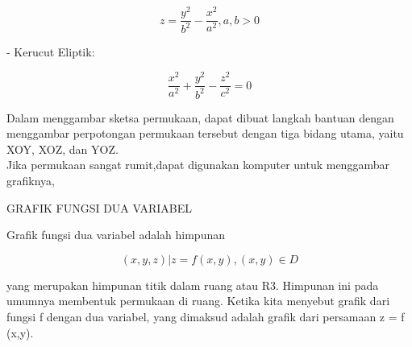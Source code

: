\documentclass[a4paper,10pt]{article}
\begin{document}
\begin{eulernotebook}
\begin{eulercomment}
\begin{eulercomment}
\begin{eulerformula}
\[
z=\frac{y^2}{b^2}-\frac{x^2}{a^2}, a,b>0
\]
\end{eulerformula}
\begin{eulercomment}
- Kerucut Eliptik:\\
\end{eulercomment}
\begin{eulerformula}
\[
\frac{x^2}{a^2}+\frac{y^2}{b^2}-\frac{z^2}{c^2}=0
\]
\end{eulerformula}
\begin{eulercomment}
Dalam menggambar sketsa permukaan, dapat dibuat langkah bantuan dengan
menggambar perpotongan permukaan tersebut dengan tiga bidang utama,
yaitu XOY, XOZ, dan YOZ.\\
Jika permukaan sangat rumit,dapat digunakan komputer untuk menggambar
grafiknya,


GRAFIK FUNGSI DUA VARIABEL

Grafik fungsi dua variabel adalah himpunan\\
\end{eulercomment}
\begin{eulerformula}
\[
{(x,y,z)| z = f (x,y),(x,y) \in D}
\]
\end{eulerformula}
\begin{eulercomment}
yang merupakan himpunan titik dalam ruang atau R3. Himpunan ini pada
umumnya membentuk permukaan di ruang. Ketika kita menyebut grafik dari
fungsi f dengan dua variabel, yang dimaksud adalah grafik dari
persamaan z = f (x,y).


\end{eulercomment}
\end{eulercomment}
\end{eulercomment}
\end{eulernotebook}
\end{document}

